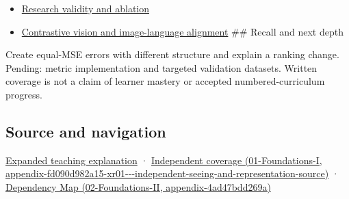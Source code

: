 \begin{itemize}
\item
  \hyperref[appendix-65788587ef78]{Research validity and ablation}
\item
  \hyperref[appendix-772f1fd96148]{Contrastive vision and image-language alignment} \#\# Recall and next depth
\end{itemize}

Create equal-MSE errors with different structure and explain a ranking change. Pending: metric implementation and targeted validation datasets. Written coverage is not a claim of learner mastery or accepted numbered-curriculum progress.

\subsection{Source and navigation}\label{appendix-b2c1846508bf-source-and-navigation}

\href{Continuous\%20Notes/University\%20-\%20Worlds,\%20Images\%20and\%20Inference\%20-\%20Graphics,\%20Vision\%20and\%20Photography\#Quality\%20numbers\%20need\%20a\%20question\%20they\%20can\%20actually\%20answer}{Expanded teaching explanation} · \href{../01-Foundations-I/main.pdf\#nameddest=appendix-fd090d982a15-xr01---independent-seeing-and-representation-source}{Independent coverage (01-Foundations-I, appendix-fd090d982a15-xr01-\/-\/-independent-seeing-and-representation-source)} · \href{../02-Foundations-II/main.pdf\#nameddest=appendix-4ad47bdd269a}{Dependency Map (02-Foundations-II, appendix-4ad47bdd269a)}
